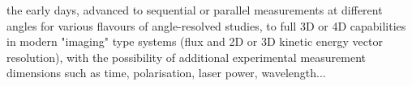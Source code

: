 the early days, advanced to sequential or parallel measurements at different angles for various flavours of angle-resolved studies, to full 3D or 4D capabilities in modern "imaging" type systems (flux and 2D or 3D kinetic energy vector resolution), with the possibility of additional experimental measurement dimensions such as time, polarisation, laser power, wavelength...